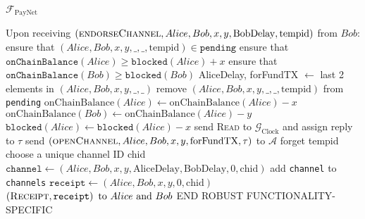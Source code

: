 \begin{functionality}{$\mathcal{F}_{\mathrm{PayNet}}$}
\begin{algorithmic}[1]
    \State Upon receiving $\left(\textsc{endorseChannel}, Alice, Bob, x, y,
    \mathrm{BobDelay}, \mathrm{tempid}\right)$ from $Bob$: 
    \Indent
      \State ensure that $\left(Alice, Bob, x, y, \_, \_, \mathrm{tempid}\right)
      \in \mathtt{pending}$
      \State ensure that $\mathtt{onChainBalance}\left(Alice\right) \geq
      \mathtt{blocked}\left(Alice\right) + x$
      \State ensure that $\mathtt{onChainBalance}\left(Bob\right) \geq
      \mathtt{blocked}\left(Bob\right)$
      \State AliceDelay, forFundTX $\gets$ last 2 elements in $\left(Alice,
      Bob, x, y, \_, \_\right)$
      \State remove $\left(Alice, Bob, x, y, \_, \_, \mathrm{tempid}\right)$
      from \texttt{pending}
      \State $\mathrm{onChainBalance}\left(Alice\right) \gets
      \mathrm{onChainBalance}\left(Alice\right) - x$
      \State $\mathrm{onChainBalance}\left(Bob\right) \gets
      \mathrm{onChainBalance}\left(Alice\right) - y$
      \State $\mathtt{blocked}\left(Alice\right) \gets
      \mathtt{blocked}\left(Alice\right) - x$
      \State send \textsc{Read} to $\mathcal{G}_{\mathrm{Clock}}$ and assign
      reply to $\tau$
      \State send $\left(\textsc{openChannel}, Alice, Bob, x, y,
      \mathrm{forFundTX}, \tau\right)$ to $\mathcal{A}$ 
      \State forget tempid
      \State choose a unique channel ID chid
      \State $\mathtt{channel} \gets \left(Alice, Bob, x, y,
      \mathrm{AliceDelay}, \mathrm{BobDelay}, 0, \mathrm{chid}\right)$
      \State add \texttt{channel} to \texttt{channels}
      \State $\mathtt{receipt} \gets \left(Alice, Bob, x, y, 0,
      \mathrm{chid}\right)$
      \State \Return $\left(\textsc{Receipt}, \mathtt{receipt}\right) \text{
      to } Alice \text{ and } Bob$
    \EndIndent
    \State END ROBUST FUNCTIONALITY-SPECIFIC


\end{algorithmic}
\end{functionality}
